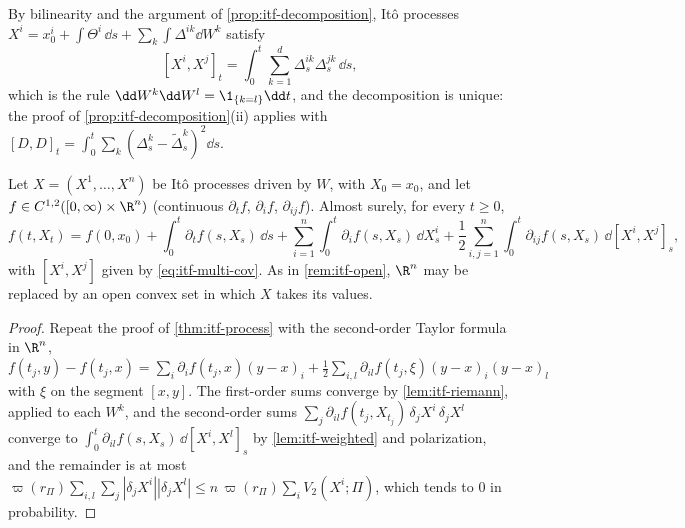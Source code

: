 By bilinearity and the argument of \cref{prop:itf-decomposition}, It\^o processes
$X^i=x^i_0+\int\Theta^i\,\dd s+\sum_k\int\Delta^{ik}\dd W^k$ satisfy
\begin{equation}\label{eq:itf-multi-cov}
  [X^i,X^j]_t=\int_0^t\sum_{k=1}^d\Delta^{ik}_s\Delta^{jk}_s\,\dd s ,
\end{equation}
which is the rule $\dd W^k\dd W^l=\1_{\{k=l\}}\dd t$, and the decomposition is unique: the proof of
\cref{prop:itf-decomposition}(ii) applies with $[D,D]_t=\int_0^t\sum_k(\Delta^k_s-\tilde\Delta^k_s)^2\dd s$.

\begin{theorem}\label{thm:itf-multi}
Let $X=(X^1,\dots,X^n)$ be It\^o processes driven by $W$, with $X_0=x_0$, and let
$f\in C^{1,2}([0,\infty)\times\R^n)$ (continuous $\partial_tf$, $\partial_if$, $\partial_{ij}f$).
Almost surely, for every $t\ge0$,
\[
  f(t,X_t)=f(0,x_0)+\int_0^t\partial_tf(s,X_s)\,\dd s+\sum_{i=1}^n\int_0^t\partial_if(s,X_s)\,\dd X^i_s
  +\frac12\sum_{i,j=1}^n\int_0^t\partial_{ij}f(s,X_s)\,\dd[X^i,X^j]_s ,
\]
with $[X^i,X^j]$ given by \eqref{eq:itf-multi-cov}. As in \cref{rem:itf-open}, $\R^n$ may be replaced
by an open convex set in which $X$ takes its values.
\end{theorem}

\begin{proof}
Repeat the proof of \cref{thm:itf-process} with the second-order Taylor formula in $\R^n$,
$f(t_j,y)-f(t_j,x)=\sum_i\partial_if(t_j,x)(y-x)_i+\frac12\sum_{i,l}\partial_{il}f(t_j,\xi)(y-x)_i(y-x)_l$
with $\xi$ on the segment $[x,y]$. The first-order sums converge by \cref{lem:itf-riemann}, applied
to each $W^k$, and the second-order sums
$\sum_j\partial_{il}f(t_j,X_{t_j})\,\delta_jX^i\,\delta_jX^l$ converge to
$\int_0^t\partial_{il}f(s,X_s)\,\dd[X^i,X^l]_s$ by \cref{lem:itf-weighted} and polarization, and the
remainder is at most $\varpi(r_\Pi)\sum_{i,l}\sum_j|\delta_jX^i||\delta_jX^l|\le n\,\varpi(r_\Pi)\sum_iV_2(X^i;\Pi)$,
which tends to $0$ in probability.
\end{proof}

